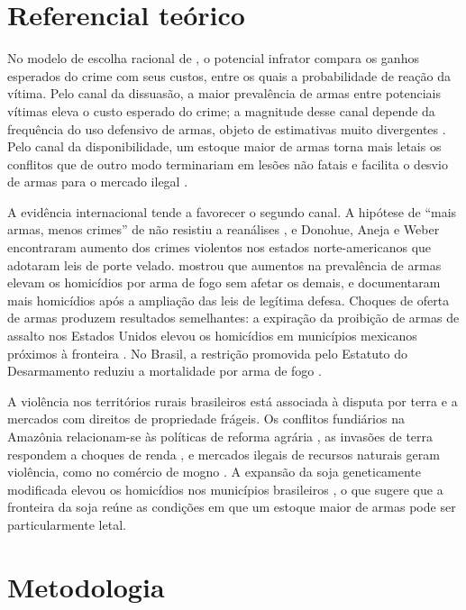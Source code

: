 \documentclass[12pt,a4paper]{article}
\begin{document}
\section{Referencial teórico}

No modelo de escolha racional de \citet{becker1968}, o potencial infrator compara os ganhos esperados do crime com seus custos, entre os quais a probabilidade de reação da vítima. Pelo canal da dissuasão, a maior prevalência de armas entre potenciais vítimas eleva o custo esperado do crime; a magnitude desse canal depende da frequência do uso defensivo de armas, objeto de estimativas muito divergentes \citep{kleck1995,cook1998}. Pelo canal da disponibilidade, um estoque maior de armas torna mais letais os conflitos que de outro modo terminariam em lesões não fatais e facilita o desvio de armas para o mercado ilegal \citep{cook2006}.

A evidência internacional tende a favorecer o segundo canal. A hipótese de ``mais armas, menos crimes'' de \citet{lott1997} não resistiu a reanálises \citep{ayres2003}, e Donohue, Aneja e Weber \citeyearpar{donohue2019} encontraram aumento dos crimes violentos nos estados norte-americanos que adotaram leis de porte velado. \citet{duggan2001} mostrou que aumentos na prevalência de armas elevam os homicídios por arma de fogo sem afetar os demais, e \citet{cheng2013} documentaram mais homicídios após a ampliação das leis de legítima defesa. Choques de oferta de armas produzem resultados semelhantes: a expiração da proibição de armas de assalto nos Estados Unidos elevou os homicídios em municípios mexicanos próximos à fronteira \citep{dube2013}. No Brasil, a restrição promovida pelo Estatuto do Desarmamento reduziu a mortalidade por arma de fogo \citep{souza2007,cerqueira2012}.

A violência nos territórios rurais brasileiros está associada à disputa por terra e a mercados com direitos de propriedade frágeis. Os conflitos fundiários na Amazônia relacionam-se às políticas de reforma agrária \citep{alston2000}, as invasões de terra respondem a choques de renda \citep{hidalgo2010}, e mercados ilegais de recursos naturais geram violência, como no comércio de mogno \citep{chimeli2017}. A expansão da soja geneticamente modificada elevou os homicídios nos municípios brasileiros \citep{moreno2024}, o que sugere que a fronteira da soja reúne as condições em que um estoque maior de armas pode ser particularmente letal.

\section{Metodologia}
\end{document}
